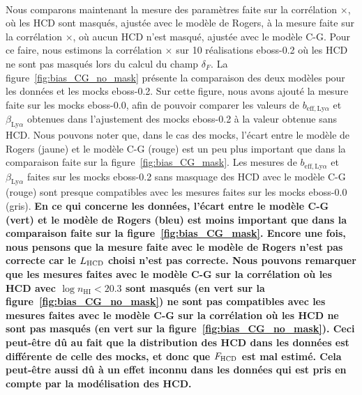 \paragraph{}
Nous comparons maintenant la mesure des paramètres \lya{} faite sur la corrélation \lya{}$\times$\lya{}, où les HCD sont masqués, ajustée avec le modèle de Rogers, à la mesure faite sur la corrélation \lya{}$\times$\lya{}, où aucun HCD n'est masqué, ajustée avec le modèle C-G.
Pour ce faire, nous estimons la corrélation \lya{}$\times$\lya{} sur \num{10} réalisations eboss-0.2 où les HCD ne sont pas masqués lors du calcul du champ $\delta_F$.
La figure~\ref{fig:bias_CG_no_mask} présente la comparaison des deux modèles pour les données et les mocks eboss-0.2.
Sur cette figure, nous avons ajouté la mesure faite sur les mocks eboss-0.0, afin de pouvoir comparer les valeurs de $b_{\mathrm{eff},\mathrm{Ly}\alpha}$ et  $\beta_{\mathrm{Ly}\alpha}$ obtenues dans l'ajustement des mocks eboss-0.2 à la valeur obtenue sans HCD.
Nous pouvons noter que, dans le cas des mocks, l'écart entre le modèle de Rogers (jaune) et le modèle C-G (rouge) est un peu plus important que dans la comparaison faite sur la figure~\ref{fig:bias_CG_mask}.
Les mesures de $b_{\mathrm{eff},\mathrm{Ly}\alpha}$ et  $\beta_{\mathrm{Ly}\alpha}$ faites sur les mocks eboss-0.2 sans masquage des HCD avec le modèle C-G (rouge) sont presque compatibles avec les mesures faites sur les mocks eboss-0.0 (gris).
\textbf{En ce qui concerne les données, l'écart entre le modèle C-G (vert) et le modèle de Rogers (bleu) est moins important que dans la comparaison faite sur la figure~\ref{fig:bias_CG_mask}. Encore une fois, nous pensons que la mesure faite avec le modèle de Rogers n'est pas correcte car le $L_{\textsc{HCD}}$ choisi n'est pas correcte. Nous pouvons remarquer que les mesures faites avec le modèle C-G sur la corrélation où les HCD avec $\log n_{\mathrm{HI}} < \num{20.3}$ sont masqués (en vert sur la figure~\ref{fig:bias_CG_no_mask}) ne sont pas compatibles avec les mesures faites avec le modèle C-G sur la corrélation où les HCD ne sont pas masqués (en vert sur la figure~\ref{fig:bias_CG_no_mask}). Ceci peut-être dû au fait que la distribution des HCD dans les données est différente de celle des mocks, et donc que $F_{\textsc{HCD}}$ est mal estimé. Cela peut-être aussi dû à un effet inconnu dans les données qui est pris en compte par la modélisation des HCD.}


